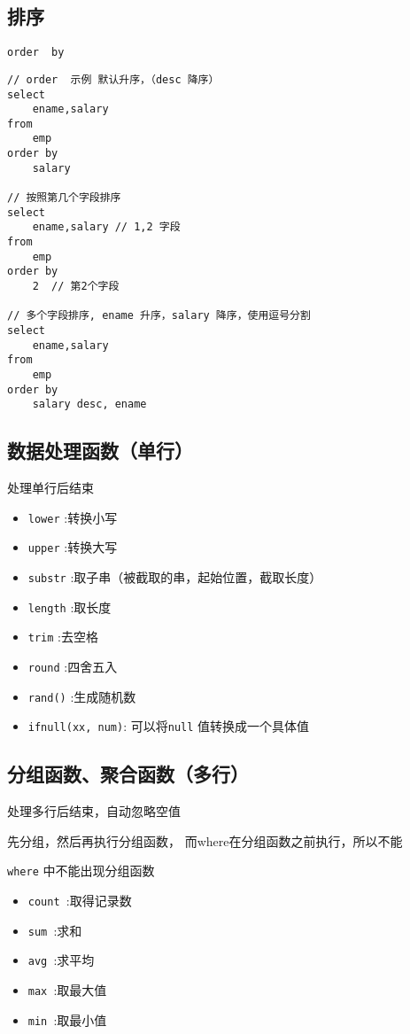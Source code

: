 \documentclass[UTF8,a4paper,12pt]{ctexbook}
\begin{document}
		\subsection{排序}
			\verb|order  by|
		
			\begin{lstlisting}
// order  示例 默认升序，（desc 降序）
select 
	ename,salary
from
	emp
order by
	salary

// 按照第几个字段排序	
select 
	ename,salary // 1,2 字段
from
	emp
order by
	2  // 第2个字段
	
// 多个字段排序, ename 升序，salary 降序，使用逗号分割
select 
	ename,salary
from
	emp
order by
	salary desc, ename
			\end{lstlisting}
		
		
		\subsection{数据处理函数（单行）}处理单行后结束
			\begin{itemize}[itemindent = 2em]
				\item \verb|lower| :转换小写
				\item \verb|upper| :转换大写
				\item \verb|substr| :取子串（被截取的串，起始位置，截取长度）
				\item \verb|length| :取长度
				\item \verb|trim| :去空格
				\item \verb|round| :四舍五入
				\item \verb|rand()| :生成随机数
				\item \verb|ifnull(xx, num)|: 可以将\verb|null| 值转换成一个具体值
			\end{itemize}
		
		
		\subsection{分组函数、聚合函数（多行）}
		
			处理多行后结束，自动忽略空值
			
			先分组，然后再执行分组函数， 而where在分组函数之前执行，所以不能
			
			\verb|where| 中不能出现分组函数
			
			\begin{itemize}[itemindent = 2em]
				\item \verb|count |:取得记录数
				\item \verb|sum |:求和
				\item \verb|avg |:求平均
				\item \verb|max |:取最大值
				\item \verb|min |:取最小值
			\end{itemize}
			
\end{document}
